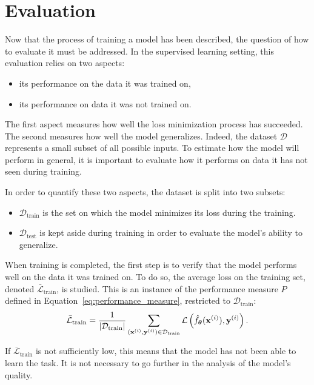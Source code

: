 \section{Evaluation}\label{sec:deep_learning_evaluation}

Now that the process of training a model has been described, the question of how to evaluate it must be addressed.
In the supervised learning setting, this evaluation relies on two aspects:

\begin{itemize}
    \item its performance on the data it was trained on,
    \item its performance on data it was not trained on.
\end{itemize}

The first aspect measures how well the loss minimization process has succeeded.
The second measures how well the model generalizes.
Indeed, the dataset $\mathcal{D}$ represents a small subset of all possible inputs.
To estimate how the model will perform in general, it is important to evaluate how it performs on data it has not seen during training.

In order to quantify these two aspects, the dataset is split into two subsets:

\begin{itemize}
    \item $\mathcal{D}_{\mathrm{train}}$ is the set on which the model minimizes its loss during the training.
    \item $\mathcal{D}_{\mathrm{test}}$ is kept aside during training in order to evaluate the model's ability to generalize.
\end{itemize}

When training is completed, the first step is to verify that the model performs well on the data it was trained on.
To do so, the average loss on the training set, denoted $\bar{\mathcal{L}}_{\mathrm{train}}$, is studied. This is an instance of the performance measure $P$ defined in Equation~\eqref{eq:performance_measure}, restricted to $\mathcal{D}_{\mathrm{train}}$:
\begin{equation}
\bar{\mathcal{L}}_{\mathrm{train}} = \frac{1}{|\mathcal{D}_{\mathrm{train}}|} \sum_{(\mathbf{x}^{(i)}, \mathbf{y}^{(i)}) \in \mathcal{D}_{\mathrm{train}}} \mathcal{L}\left(\hat{f}_{\boldsymbol{\theta}}(\mathbf{x}^{(i)}), \mathbf{y}^{(i)}\right).
\label{eq:train_loss}
\end{equation}

If $\bar{\mathcal{L}}_{\mathrm{train}}$ is not sufficiently low, this means that the model has not been able to learn the task.
It is not necessary to go further in the analysis of the model's quality.

